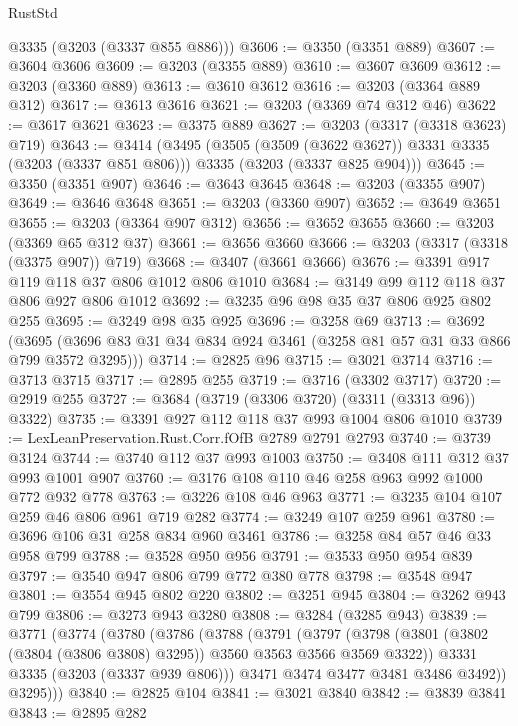 \begin{lexlean}{RustStd}
\begin{coremodule}
{\begin{coremodule}
{{{{{{{{{{{{{{{      @3335
      (@3203 (@3337 @855 @886)))
@3606 := @3350 (@3351 @889)
@3607 := @3604 @3606
@3609 := @3203 (@3355 @889)
@3610 := @3607 @3609
@3612 := @3203 (@3360 @889)
@3613 := @3610 @3612
@3616 := @3203 (@3364 @889 @312)
@3617 := @3613 @3616
@3621 := @3203 (@3369 @74 @312 @46)
@3622 := @3617 @3621
@3623 := @3375 @889
@3627 := @3203 (@3317 (@3318 @3623) @719)
@3643 := @3414
    (@3495
      (@3505 (@3509 (@3622 @3627)) @3331 @3335 (@3203 (@3337 @851 @806)))
      @3335
      (@3203 (@3337 @825 @904)))
@3645 := @3350 (@3351 @907)
@3646 := @3643 @3645
@3648 := @3203 (@3355 @907)
@3649 := @3646 @3648
@3651 := @3203 (@3360 @907)
@3652 := @3649 @3651
@3655 := @3203 (@3364 @907 @312)
@3656 := @3652 @3655
@3660 := @3203 (@3369 @65 @312 @37)
@3661 := @3656 @3660
@3666 := @3203 (@3317 (@3318 (@3375 @907)) @719)
@3668 := @3407 (@3661 @3666)
@3676 := @3391 @917 @119 @118 @37 @806 @1012 @806 @1010
@3684 := @3149 @99 @112 @118 @37 @806 @927 @806 @1012
@3692 := @3235 @96 @98 @35 @37 @806 @925 @802 @255
@3695 := @3249 @98 @35 @925
@3696 := @3258 @69
@3713 := @3692
    (@3695 (@3696 @83 @31 @34 @834 @924 @3461 (@3258 @81 @57 @31 @33 @866 @799 @3572 @3295)))
@3714 := @2825 @96
@3715 := @3021 @3714
@3716 := @3713 @3715
@3717 := @2895 @255
@3719 := @3716 (@3302 @3717)
@3720 := @2919 @255
@3727 := @3684 (@3719 (@3306 @3720) (@3311 (@3313 @96)) @3322)
@3735 := @3391 @927 @112 @118 @37 @993 @1004 @806 @1010
@3739 := LexLeanPreservation.Rust.Corr.fOfB @2789 @2791 @2793
@3740 := @3739 @3124
@3744 := @3740 @112 @37 @993 @1003
@3750 := @3408 @111 @312 @37 @993 @1001 @907
@3760 := @3176 @108 @110 @46 @258 @963 @992 @1000 @772 @932 @778
@3763 := @3226 @108 @46 @963
@3771 := @3235 @104 @107 @259 @46 @806 @961 @719 @282
@3774 := @3249 @107 @259 @961
@3780 := @3696 @106 @31 @258 @834 @960 @3461
@3786 := @3258 @84 @57 @46 @33 @958 @799
@3788 := @3528 @950 @956
@3791 := @3533 @950 @954 @839
@3797 := @3540 @947 @806 @799 @772 @380 @778
@3798 := @3548 @947
@3801 := @3554 @945 @802 @220
@3802 := @3251 @945
@3804 := @3262 @943 @799
@3806 := @3273 @943 @3280
@3808 := @3284 (@3285 @943)
@3839 := @3771
    (@3774
      (@3780
        (@3786
          (@3788
            (@3791
              (@3797
                (@3798 (@3801 (@3802 (@3804 (@3806 @3808) @3295)) @3560 @3563 @3566 @3569 @3322))
                @3331
                @3335
                (@3203 (@3337 @939 @806)))
              @3471
              @3474
              @3477
              @3481
              @3486
              @3492))
          @3295)))
@3840 := @2825 @104
@3841 := @3021 @3840
@3842 := @3839 @3841
@3843 := @2895 @282
}}}}}}}}}}}}}}}
\end{coremodule}}
\end{coremodule}
\end{lexlean}
